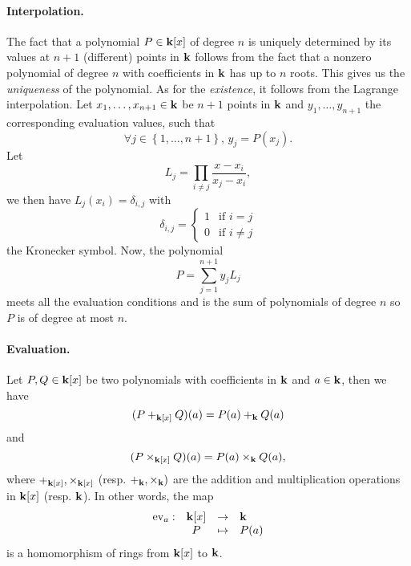 \paragraph{Interpolation.} The fact that a polynomial $P\in\mathbf{k}[x]$ of degree $n$
is uniquely determined by its values at $n+1$ (different) points in $\mathbf{k}$ follows
from the fact that a nonzero polynomial of degree $n$ with coefficients in $\mathbf{k}$ has up
to $n$ roots. This gives us the \emph{uniqueness} of the polynomial. As for the
\emph{existence}, it follows from the Lagrange interpolation. Let $x_1, \dots,
x_{n+1}\in\mathbf{k}$ be $n+1$ points in $\mathbf{k}$ and $y_1, \dots, y_{n+1}$ the
corresponding evaluation values, such that
\[
  \forall j\in\left\{ 1, \dots, n+1 \right\},\,y_j = P(x_j).
\]
Let 
\[
  L_j = \prod_{i\neq j}\frac{x-x_i}{x_j-x_i},
\]
we then have $L_j(x_i) = \delta_{i, j}$ with
\[
  \delta_{i, j} = 
  \left\{\begin{array}{ll}
      1&\mbox{if } i=j\\
      0&\mbox{if } i\neq j
    \end{array}
    \right.
\]
the Kronecker symbol. Now, the polynomial
\[
  P = \sum_{j=1}^{n+1} y_j L_j
\]
meets all the evaluation conditions and is the sum of polynomials of degree $n$
so $P$ is of degree at most $n$.

\paragraph{Evaluation.} Let $P, Q\in\mathbf{k}[x]$ be two polynomials with coefficients
in $\mathbf{k}$ and $a\in\mathbf{k}$, then we have
\[
  (P+_{\mathbf{k}[x]}Q)(a) = P(a) +_{\mathbf{k}} Q(a)
\]
and 
\[
  (P\times_{\mathbf{k}[x]} Q)(a) = P(a) \times_{\mathbf{k}} Q(a),
\]
where $+_{\mathbf{k}[x]}, \times_{\mathbf{k}[x]}$ (resp. $+_{\mathbf{k}}, \times_{\mathbf{k}})$ are the addition
and multiplication operations in $\mathbf{k}[x]$ (resp. $\mathbf{k}$).
In other words, the map
\[
\begin{array}{lccl}
  \textrm{ev}_a:&\mathbf{k}[x]&\to&\mathbf{k}\\
  &P&\mapsto&P(a)
\end{array}
\]
is a homomorphism of rings from $\mathbf{k}[x]$ to $\mathbf{k}$.

